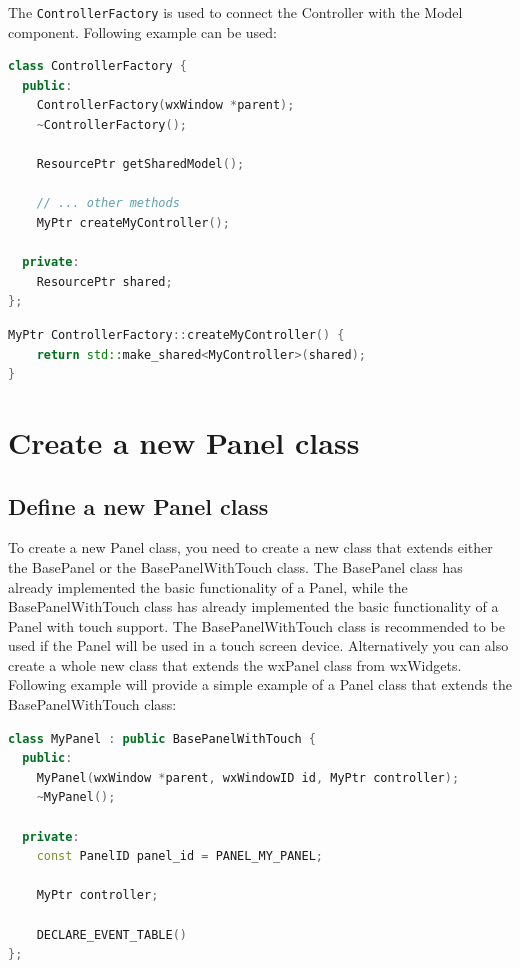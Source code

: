 The \texttt{ControllerFactory} is used to connect the Controller with the Model component. Following example can be used:

\begin{lstlisting}[language=C++, caption={ControllerFactory method example}]
class ControllerFactory {
  public:
    ControllerFactory(wxWindow *parent);
    ~ControllerFactory();

    ResourcePtr getSharedModel();

    // ... other methods
    MyPtr createMyController();

  private:
    ResourcePtr shared;
};
\end{lstlisting}

\begin{lstlisting}[language=C++, caption={Implementation of createMyController method}]
MyPtr ControllerFactory::createMyController() {
    return std::make_shared<MyController>(shared);
}
\end{lstlisting}

\section{Create a new Panel class}

\subsection{Define a new Panel class}

To create a new Panel class, you need to create a new class that extends either the BasePanel or the BasePanelWithTouch class. The BasePanel class has already implemented the basic functionality of a Panel, while the BasePanelWithTouch class has already implemented the basic functionality of a Panel with touch support. The BasePanelWithTouch class is recommended to be used if the Panel will be used in a touch screen device. Alternatively you can also create a whole new class that extends the wxPanel class from wxWidgets. Following example will provide a simple example of a Panel class that extends the BasePanelWithTouch class:

\begin{lstlisting}[language=C++, caption={MyPanel class example}]
class MyPanel : public BasePanelWithTouch {
  public:
    MyPanel(wxWindow *parent, wxWindowID id, MyPtr controller);
    ~MyPanel();

  private:
    const PanelID panel_id = PANEL_MY_PANEL;

    MyPtr controller;

    DECLARE_EVENT_TABLE()
};
\end{lstlisting}

